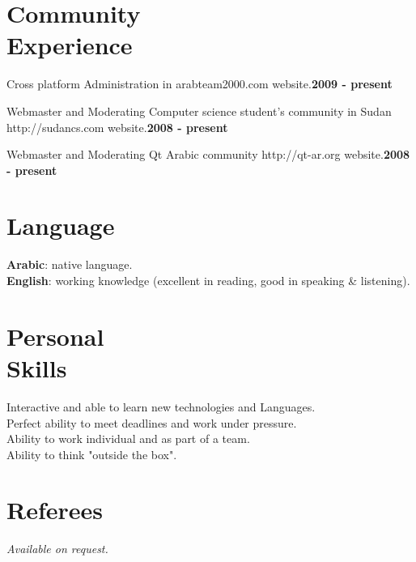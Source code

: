 \documentclass[margin,line]{resume}
\begin{document}
\begin{resume}
\section{\mysidestyle  Community\\Experience} 
Cross platform Administration in arabteam2000.com website.\hfill \textbf{2009 - present}\vspace{-3mm}\\\vspace{-1mm}

Webmaster and Moderating Computer science student's community in Sudan http://sudancs.com website.\hfill \textbf{2008 - present}\vspace{-3mm}\\\vspace{-1mm}

Webmaster and Moderating Qt Arabic community http://qt-ar.org website.\hfill \textbf{2008 - present}\vspace{-3mm}\\\vspace{-1mm}

\section{\mysidestyle Language}
	\textbf{Arabic}:   native language.\\
	\textbf{English}: working knowledge (excellent in reading, good in speaking \& listening).\\

\section{\mysidestyle Personal\\Skills}
	Interactive and able to learn new technologies and Languages.\\
	Perfect ability to meet deadlines and work under pressure.\\
	Ability to work individual and as part of a team.\\
	Ability to think "outside the box".

    \section{\mysidestyle Referees} 
    {\sl Available on request.}

\end{resume}
\end{document}
